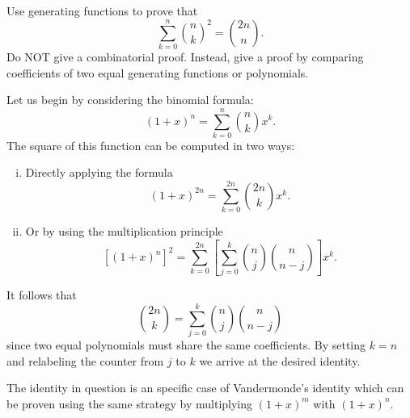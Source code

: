 \documentclass[12pt]{memoir}
\begin{document}
\iffalse
\begin{ptcbr}
    Suppose $\la+(\la_1,\dots,\la_k)\vdash n$ is a partition of $n$ into $k$ parts. We can separate every partition into two categories:
    \begin{itemize}
        \itemsep=-0.4em
        \item One of the parts of $\la$ is 1.
        \item All of the parts of $\la$ are greater than 1.
    \end{itemize}
    Then we can count $p(n,k)$ using a recurrence as follows:
    \begin{itemize}
        \itemsep=-0.4em
        \item If $\la$ has a one, then we can remove that part and get $k-1$ parts. However we are no longer partitioning $n$, we now partition $n-1$.
        \item If there's no one, we can subtract one from every part. Since there were $k$ parts, we have reduced $n$ by $k$ to get $n-k$. But we still have $k$ parts. 
    \end{itemize}
    It follows that 
    $$p(n,k)=p(n-1,k-1)+p(n-k,k),\ p(n,1)=1,\ p(1,k)=\dl_{1k}$$
    where the boundary conditions tell us the following. The term $p(n,1)$ is the number of ways to partition $n$ into a single part. There's only one way to so and that is by choosing the part equal to $n$.\par 
    On the other hand $p(1,k)$ is the number of ways to partition $1$ into $k$ parts. Unless $k=1$, there's no way to partition $1$ into more than one part.\par 
    Let us write this recurrence With this recurrence in hand, let us call 
    $$P(x,y)=\sum_{n,k=1}^\infty p(n,k)x^ny^k$$
\end{ptcbr}
\fi 
\newpage
\begin{Ej}[Exercise 9]
    Use generating functions to prove that 
    $$\sum_{k=0}^n\binom{n}{k}^2=\binom{2n}{n}.$$
    Do NOT give a combinatorial proof. Instead, give a proof by comparing coefficients of two equal generating functions or polynomials.
\end{Ej}

\begin{ptcbr}
    Let us begin by considering the binomial formula:
    $$(1+x)^n=\sum_{k=0}^n\binom{n}{k}x^k.$$
    The square of this function can be computed in two ways:
    \begin{enumerate}[i)]
        \itemsep=-0.4em
        \item Directly applying the formula 
        $$(1+x)^{2n}=\sum_{k=0}^{2n}\binom{2n}{k}x^k.$$
        \item Or by using the multiplication principle 
        $$\left\lbrack(1+x)^n\right\rbrack^2=\sum_{k=0}^{2n}\left\lbrack\sum_{j=0}^k\binom{n}{j}\binom{n}{n-j}\right\rbrack x^k.$$
    \end{enumerate}
    It follows that 
    $$\binom{2n}{k}=\sum_{j=0}^k\binom{n}{j}\binom{n}{n-j}$$
    since two equal polynomials must share the same coefficients. By setting $k=n$ and relabeling the counter from $j$ to $k$ we arrive at the desired identity.
\end{ptcbr}

The identity in question is an specific case of Vandermonde's identity which can be proven using the same strategy by multiplying $(1+x)^m$ with $(1+x)^n$.
\end{document}
